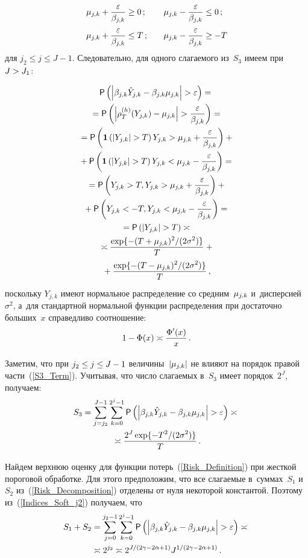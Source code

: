 \begin{multicols}{2}
\noindent
\begin{alignat*}{2}
\mujk+\fr{\varepsilon}{\betajk}&\geq0\,;&\quad \mujk-\fr{\varepsilon}{\betajk}&\leq0\,;\\
\mujk+\fr{\varepsilon}{\betajk}&\leq T\,;&\quad \mujk-\fr{\varepsilon}{\betajk}&\geq -T
\end{alignat*}
для $j_2\leq j\leq J-1$. Следовательно, для одного сла\-га\-емо\-го из~$S_3$ имеем при 
$J\hm>J_1$:

\pagebreak

\noindent
\begin{multline}
{\sf P}\left(\left|\betajk\hat{Y}_{j,k}-\betajk\mujk\right|>\varepsilon\right)={}\\
{}=
{\sf P}\left(\left|\rho_{T}^{(h)}(Y_{j,k})-\mujk\right|>
\fr{\varepsilon}{\betajk}\right)={}\\
{}={\sf P}\left(\mathbf{1}\left(|Y_{j,k}|>T\right)Y_{j,k}>\mujk+
\fr{\varepsilon}{\betajk}\right)+{}\\
{}+
{\sf P}\left(\mathbf{1}\left(|Y_{j,k}|>T\right)Y_{j,k}<
\mujk-\fr{\varepsilon}{\betajk}\right)={}\\
{}={\sf P}\left(Y_{j,k}>T,Y_{j,k}>\mujk+\fr{\varepsilon}{\betajk}\right)+{}\\
{}+
{\sf P}\left(Y_{j,k}<-T,Y_{j,k}<\mujk-\fr{\varepsilon}{\betajk}\right)={}\\
{}=
{\sf P}\left(\left|Y_{j,k}\right|>T\right)\asymp{}\\
{}\asymp \fr{\exp\{-{(T+\mujk)^2}/({2\sigma^2})\}}{T}+{}\\
{}+
\fr{\exp\{-{(T-\mujk)^2}/({2\sigma^2})\}}{T}\,,
\label{S3_Term}
\end{multline}
поскольку $Y_{j,k}$ имеют нормальное распределение со средним~$\mu_{j,k}$ 
и~дисперсией~$\sigma^2$, а~для стандартной нормальной функ\-ции распределения 
при до\-ста\-точ\-но больших~$x$ справедливо соотношение:
$$
1-\Phi(x)\asymp\displaystyle\frac{\displaystyle \Phi'(x)\mathstrut}{\displaystyle x\mathstrut}\,.
$$

Заметим, что при $j_2\leq j\hm\leq J-1$ величины~$|\mu_{j,k}|$ не влияют на 
порядок правой час\-ти~(\ref{S3_Term}). Учитывая, что чис\-ло слагаемых в~$S_3$ 
имеет порядок~$2^J$, получаем:
\begin{multline}
S_3=\sum\limits_{j=j_2}^{J-1}\sumk{\sf P}\left(\left|
\betajk\hat{Y}_{j,k}-\betajk\mujk\right|>\varepsilon\right)\asymp{}\\
{}\asymp
\fr{2^J\exp\{-T^2/(2\sigma^2)\}}{T}\,.
\label{S3_Order}
\end{multline}

Найдем верхнюю оценку для функции потерь~(\ref{Risk_Definition}) при жест\-кой 
пороговой обработке. Для этого предположим, что все сла\-га\-емые в~суммах~$S_1$ и~$S_2$ 
из~(\ref{Risk_Decomposition}) отделены от нуля некоторой константой. Поэтому 
из~(\ref{Indices_Soft_j2}) получаем, что
\begin{multline}
S_1+S_2=\sum\limits_{j=0}^{j_2-1}\sumk{\sf P}\left(\left|
\betajk\hat{Y}_{j,k}-\betajk\mujk\right|>\varepsilon\right)\asymp{}\\
{}\asymp 2^{j_2}\asymp 2^{{J}/({2\gamma-2\alpha+1})}J^{1/(2\gamma-2\alpha+1)}\,.
\label{S1S2_Order}
\end{multline}


\end{multicols}
